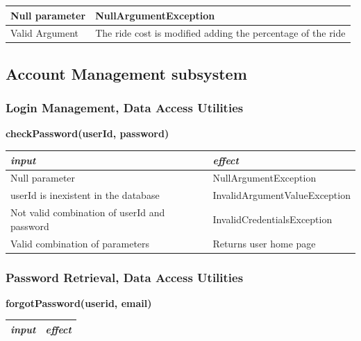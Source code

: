 \documentclass{article}
\begin{document}
\begin{flushleft}
\begin{center}
\begin{tabular}{  |  p{6cm} | p{6cm} |}
      Null parameter & NullArgumentException
     \\ 
  \hline
   Valid Argument & The ride cost is modified adding the percentage of  the ride  \\
 
  \hline
    \end{tabular}
\end{center}
        
        
 
        
        
   \newpage     
    \subsection{Account Management subsystem} %
     \subsubsection{Login Management, Data Access Utilities}
     
       \begin{center}
   \begin {flushleft}
    \textbf{checkPassword(userId, password)}
    \end{flushleft}
        \begin{tabular}{  |  p{6cm} | p{6cm} |}
    \hline
    \textit{input} &  \textit{effect} \\
    \hline
    
    Null parameter & NullArgumentException 
     \\ 
  \hline
   userId is inexistent in the database & InvalidArgumentValueException \\
  \hline
  Not valid combination of userId and password &  InvalidCredentialsException  \\
  \hline
  Valid combination of parameters & Returns user home page \\
  \hline
    \end{tabular}
\end{center}
     
     
      \subsubsection{Password Retrieval, Data Access Utilities}
      
      
        \begin{center}
   \begin {flushleft}
    \textbf{forgotPassword(userid, email)}
    \end{flushleft}
        \begin{tabular}{  |  p{6cm} | p{6cm} |}
    \hline
    \textit{input} &  \textit{effect} \\
    \hline
    

\end{tabular}
\end{center}
\end{flushleft}
\end{document}
